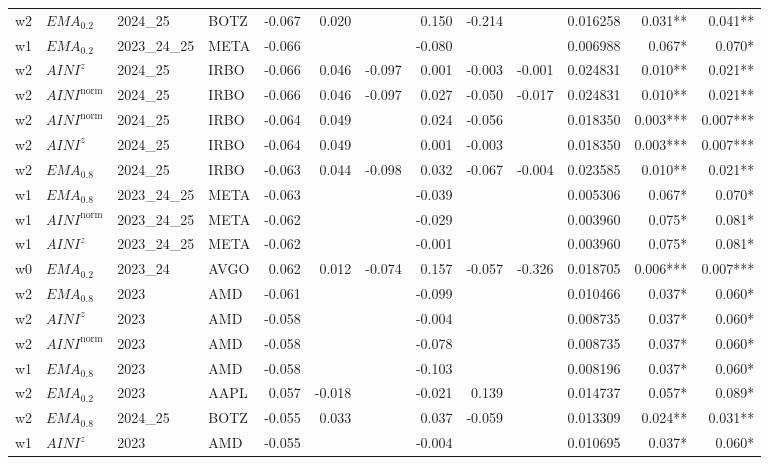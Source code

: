 \begin{longtable}{@{}llllrrrrrrrrr@{}}
w2 & $EMA_{0.2}$ & 2024\_25 & BOTZ & -0.067 & 0.020 &  & 0.150 & -0.214 &  & 0.016258 & 0.031** & 0.041** \\
w1 & $EMA_{0.2}$ & 2023\_24\_25 & META & -0.066 &  &  & -0.080 &  &  & 0.006988 & 0.067* & 0.070* \\
w2 & $AINI^{z}$ & 2024\_25 & IRBO & -0.066 & 0.046 & -0.097 & 0.001 & -0.003 & -0.001 & 0.024831 & 0.010** & 0.021** \\
w2 & $AINI^{\mathrm{norm}}$ & 2024\_25 & IRBO & -0.066 & 0.046 & -0.097 & 0.027 & -0.050 & -0.017 & 0.024831 & 0.010** & 0.021** \\
w2 & $AINI^{\mathrm{norm}}$ & 2024\_25 & IRBO & -0.064 & 0.049 &  & 0.024 & -0.056 &  & 0.018350 & 0.003*** & 0.007*** \\
w2 & $AINI^{z}$ & 2024\_25 & IRBO & -0.064 & 0.049 &  & 0.001 & -0.003 &  & 0.018350 & 0.003*** & 0.007*** \\
w2 & $EMA_{0.8}$ & 2024\_25 & IRBO & -0.063 & 0.044 & -0.098 & 0.032 & -0.067 & -0.004 & 0.023585 & 0.010** & 0.021** \\
w1 & $EMA_{0.8}$ & 2023\_24\_25 & META & -0.063 &  &  & -0.039 &  &  & 0.005306 & 0.067* & 0.070* \\
w1 & $AINI^{\mathrm{norm}}$ & 2023\_24\_25 & META & -0.062 &  &  & -0.029 &  &  & 0.003960 & 0.075* & 0.081* \\
w1 & $AINI^{z}$ & 2023\_24\_25 & META & -0.062 &  &  & -0.001 &  &  & 0.003960 & 0.075* & 0.081* \\
w0 & $EMA_{0.2}$ & 2023\_24 & AVGO & 0.062 & 0.012 & -0.074 & 0.157 & -0.057 & -0.326 & 0.018705 & 0.006*** & 0.007*** \\
w2 & $EMA_{0.8}$ & 2023 & AMD & -0.061 &  &  & -0.099 &  &  & 0.010466 & 0.037* & 0.060* \\
w2 & $AINI^{z}$ & 2023 & AMD & -0.058 &  &  & -0.004 &  &  & 0.008735 & 0.037* & 0.060* \\
w2 & $AINI^{\mathrm{norm}}$ & 2023 & AMD & -0.058 &  &  & -0.078 &  &  & 0.008735 & 0.037* & 0.060* \\
w1 & $EMA_{0.8}$ & 2023 & AMD & -0.058 &  &  & -0.103 &  &  & 0.008196 & 0.037* & 0.060* \\
w2 & $EMA_{0.2}$ & 2023 & AAPL & 0.057 & -0.018 &  & -0.021 & 0.139 &  & 0.014737 & 0.057* & 0.089* \\
w2 & $EMA_{0.8}$ & 2024\_25 & BOTZ & -0.055 & 0.033 &  & 0.037 & -0.059 &  & 0.013309 & 0.024** & 0.031** \\
w1 & $AINI^{z}$ & 2023 & AMD & -0.055 &  &  & -0.004 &  &  & 0.010695 & 0.037* & 0.060* \\

\end{longtable}
